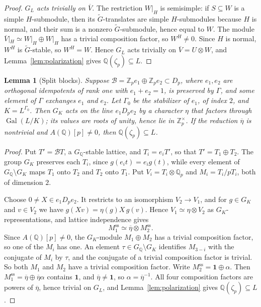 \documentclass[11pt]{article}
\newtheorem{lemma}{Lemma}
\newcommand{\Q}{\mathbb Q}
\newcommand{\Z}{\mathbb Z}
\DeclareMathOperator{\Gal}{Gal}
\begin{document}
\begin{proof}
\emph{\(G_L\) acts trivially on \(\overline V\).} The restriction
\(W|_H\) is semisimple: if \(S\subseteq W\) is a simple
\(H\)-submodule, then its \(\widetilde G\)-translates are simple
\(H\)-submodules because \(H\) is normal, and their sum is a nonzero
\(\widetilde G\)-submodule, hence equal to \(W\). The module
\(\overline V|_H\simeq W|_H\oplus W|_H\) has a trivial composition
factor, so \(W^H\neq0\). Since \(H\) is normal, \(W^H\) is
\(\widetilde G\)-stable, so \(W^H=W\). Hence \(G_L\) acts trivially on
\(\overline V=U\otimes W\), and Lemma~\ref{lem:polarization} gives
\(\Q(\zeta_p)\subseteq L\).
\end{proof}

\begin{lemma}[Split blocks]\label{lem:split}
Suppose \(\mathcal B=\Z_pe_1\oplus\Z_pe_2\subset D_p\), where
\(e_1,e_2\) are orthogonal idempotents of rank one with \(e_1+e_2=1\),
is preserved by \(\Gamma\), and some element of \(\Gamma\) exchanges
\(e_1\) and \(e_2\). Let \(\Gamma_0\) be the stabilizer of \(e_1\), of
index \(2\), and \(K=L^{\Gamma_0}\). Then \(G_K\) acts on the line
\(e_1D_pe_2\) by a character \(\eta\) that factors through
\(\Gal(L/K)\); its values are roots of unity, hence lie in
\(\Z_p^\times\). If the reduction \(\overline\eta\) is nontrivial and
\(A(\Q)[p]\neq0\), then \(\Q(\zeta_p)\subseteq L\).
\end{lemma}

\begin{proof}
Put \(T'=\mathcal BT\), a \(G_{\Q}\)-stable lattice, and
\(T_i=e_iT'\), so that \(T'=T_1\oplus T_2\). The group \(G_K\) preserves
each \(T_i\), since \(g(e_it)=e_ig(t)\), while every element of
\(G_{\Q}\setminus G_K\) maps \(T_1\) onto \(T_2\) and \(T_2\) onto
\(T_1\). Put \(V_i=T_i\otimes\Q_p\) and \(M_i=T_i/pT_i\), both of
dimension \(2\).

Choose \(0\neq X\in e_1D_pe_2\). It restricts to an isomorphism
\(V_2\to V_1\), and for \(g\in G_K\) and \(v\in V_2\) we have
\(g(Xv)=\eta(g)X\,g(v)\). Hence \(V_1\simeq\eta\otimes V_2\) as
\(G_K\)-representations, and lattice independence gives
\[
 M_1^{\mathrm{ss}}\simeq\overline\eta\otimes M_2^{\mathrm{ss}}.
\]
Since \(A(\Q)[p]\neq0\), the \(G_K\)-module \(M_1\oplus M_2\) has a
trivial composition factor, so one of the \(M_i\) has one. An element
\(\tau\in G_{\Q}\setminus G_K\) identifies \(M_{3-i}\) with the
conjugate of \(M_i\) by \(\tau\), and the conjugate of a trivial
composition factor is trivial. So both \(M_1\) and \(M_2\) have a
trivial composition factor. Write
\(M_2^{\mathrm{ss}}=\mathbf 1\oplus\alpha\). Then
\(M_1^{\mathrm{ss}}=\overline\eta\oplus\overline\eta\alpha\) contains
\(\mathbf 1\), and \(\overline\eta\neq\mathbf 1\), so
\(\alpha=\overline\eta^{-1}\). All four composition factors are powers
of \(\overline\eta\), hence trivial on \(G_L\), and
Lemma~\ref{lem:polarization} gives \(\Q(\zeta_p)\subseteq L\).
\end{proof}
\end{document}
